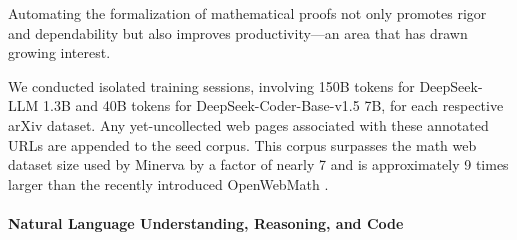 \begin{itemize}[topsep=0pt]
\begin{itemize}[topsep=0pt]
Automating the formalization of mathematical proofs not only promotes rigor and dependability but also improves productivity—an area that has drawn growing interest. \end{itemize}

We conducted isolated training sessions, involving 150B tokens for DeepSeek-LLM 1.3B and 40B tokens for DeepSeek-Coder-Base-v1.5 7B, for each respective arXiv dataset. Any yet-uncollected web pages associated with these annotated URLs are appended to the seed corpus. This corpus surpasses the math web dataset size used by Minerva \citep{minerva} by a factor of nearly 7 and is approximately 9 times larger than the recently introduced OpenWebMath \citep{openwebmath}. \paragraph{Natural Language Understanding, Reasoning, and Code}


\end{itemize}

